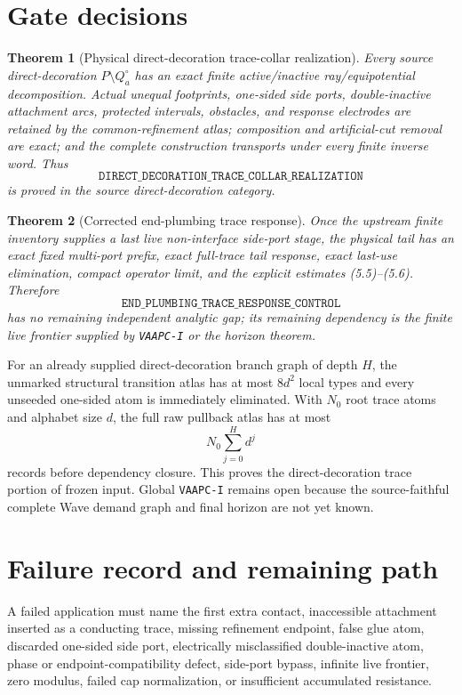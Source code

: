 \documentclass[11pt]{article}
\newtheorem{theorem}{Theorem}[section]
\theoremstyle{definition}
\theoremstyle{remark}
\begin{document}
\section{Gate decisions}

\begin{theorem}[Physical direct-decoration trace-collar realization]
Every source direct-decoration $P\setminus Q_a^\circ$ has an exact finite
active/inactive ray/equipotential decomposition.  Actual unequal footprints,
one-sided side ports, double-inactive attachment arcs, protected intervals,
obstacles, and response electrodes are retained by the common-refinement atlas;
composition and artificial-cut removal are exact; and the complete construction
transports under every finite inverse word.  Thus
\[
 \boxed{\texttt{DIRECT\_DECORATION\_TRACE\_COLLAR\_REALIZATION}}
\]
is proved in the source direct-decoration category.
\end{theorem}

\begin{theorem}[Corrected end-plumbing trace response]
Once the upstream finite inventory supplies a last live non-interface side-port
stage, the physical tail has an exact fixed multi-port prefix, exact full-trace
tail response, exact last-use elimination, compact operator limit, and the
explicit estimates (5.5)--(5.6).  Therefore
\[
 \boxed{\texttt{END\_PLUMBING\_TRACE\_RESPONSE\_CONTROL}}
\]
has no remaining independent analytic gap; its remaining dependency is the
finite live frontier supplied by \texttt{VAAPC-I} or the horizon theorem.
\end{theorem}

For an already supplied direct-decoration branch graph of depth $H$, the
unmarked structural transition atlas has at most $8d^2$ local types and every
unseeded one-sided atom is immediately eliminated.  With $N_0$ root trace atoms
and alphabet size $d$, the full raw pullback atlas has at most
\[
 N_0\sum_{j=0}^{H}d^j
\]
records before dependency closure.  This proves the direct-decoration trace
portion of frozen input.  Global \texttt{VAAPC-I} remains open because the
source-faithful complete Wave demand graph and final horizon are not yet known.

\section{Failure record and remaining path}

A failed application must name the first extra contact, inaccessible attachment
inserted as a conducting trace, missing refinement endpoint, false glue atom,
discarded one-sided side port, electrically misclassified double-inactive atom,
phase or endpoint-compatibility defect, side-port bypass, infinite live frontier,
zero modulus, failed cap normalization, or insufficient accumulated resistance.
\end{document}
